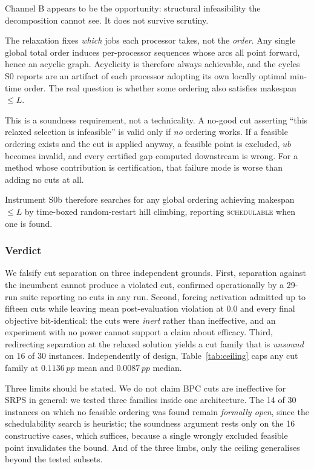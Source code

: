\documentclass[11pt,a4paper]{article}
\newcommand{\pp}{\,pp}
\begin{document}
Channel B appears to be the opportunity: structural infeasibility the
decomposition cannot see. It does not survive scrutiny.

The relaxation fixes \emph{which} jobs each processor takes, not the \emph{order}.
Any single global total order induces per-processor sequences whose arcs all point
forward, hence an acyclic graph. Acyclicity is therefore always achievable, and
the cycles S0 reports are an artifact of each processor adopting its own locally
optimal min-time order. The real question is whether some ordering also satisfies
makespan $\le L$.

This is a soundness requirement, not a technicality. A no-good cut asserting
``this relaxed selection is infeasible'' is valid only if \emph{no} ordering works.
If a feasible ordering exists and the cut is applied anyway, a feasible point is
excluded, $ub$ becomes invalid, and every certified gap computed downstream is
wrong. For a method whose contribution is certification, that failure mode is
worse than adding no cuts at all.

Instrument S0b therefore searches for any global ordering achieving makespan
$\le L$ by time-boxed random-restart hill climbing, reporting \textsc{schedulable}
when one is found.



\subsubsection{Verdict}\label{sec:cuts-verdict}

We falsify cut separation on three independent grounds. First, separation
against the
incumbent cannot produce a violated cut, confirmed operationally by a 29-run suite
reporting no cuts in any run. Second, forcing activation admitted up to fifteen
cuts while leaving mean post-evaluation violation at $0.0$ and every final
objective bit-identical: the cuts were \emph{inert} rather than ineffective, and an
experiment with no power cannot support a claim about efficacy. Third, redirecting
separation at the relaxed solution yields a cut family that is \emph{unsound} on
16 of 30 instances. Independently of design, Table~\ref{tab:ceiling} caps any cut
family at $0.1136\pp$ mean and $0.0087\pp$ median.

Three limits should be stated. We do not claim BPC cuts are ineffective for SRPS
in general: we tested three families inside one architecture. The 14 of 30
instances on which no feasible ordering was found remain \emph{formally open},
since the schedulability search is heuristic; the soundness argument rests only on
the 16 constructive cases, which suffices, because a single wrongly excluded
feasible point invalidates the bound. And of the three limbs, only the ceiling
generalises beyond the tested subsets.
\end{document}
